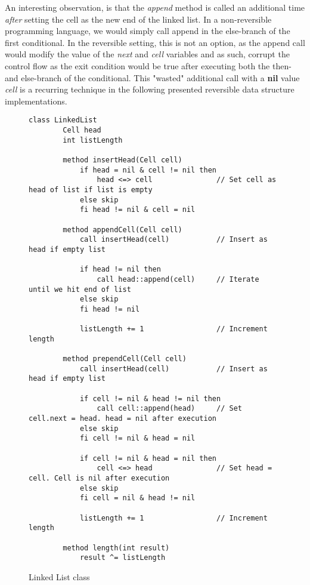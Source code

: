 An interesting observation, is that the \textit{append} method is called an additional time \textit{after} setting the cell as the new end of the linked list. In a non-reversible programming language, we would simply call append in the else-branch of the first conditional. In the reversible setting, this is not an option, as the append call would modify the value of the \textit{next} and \textit{cell} variables and as such, corrupt the control flow as the exit condition would be true after executing both the then- and else-branch of the conditional.
This "wasted" additional call with a \textbf{nil} value \textit{cell} is a recurring technique in the following presented reversible data structure implementations. 

\begin{figure}[ht!]
    \centering
    \begin{lstlisting}[style = basic, language = roopl]                
    class LinkedList
        Cell head
        int listLength
    
        method insertHead(Cell cell)
            if head = nil & cell != nil then
                head <=> cell               // Set cell as head of list if list is empty
            else skip
            fi head != nil & cell = nil
    
        method appendCell(Cell cell)
            call insertHead(cell)           // Insert as head if empty list
    
            if head != nil then
                call head::append(cell)     // Iterate until we hit end of list
            else skip
            fi head != nil
    
            listLength += 1                 // Increment length
    
        method prependCell(Cell cell)
            call insertHead(cell)           // Insert as head if empty list
    
            if cell != nil & head != nil then
                call cell::append(head)     // Set cell.next = head. head = nil after execution
            else skip
            fi cell != nil & head = nil
    
            if cell != nil & head = nil then
                cell <=> head               // Set head = cell. Cell is nil after execution
            else skip
            fi cell = nil & head != nil
    
            listLength += 1                 // Increment length
    
        method length(int result)
            result ^= listLength  
    \end{lstlisting}
    \caption{Linked List class}
    \label{fig:linked-list-class}
\end{figure}

